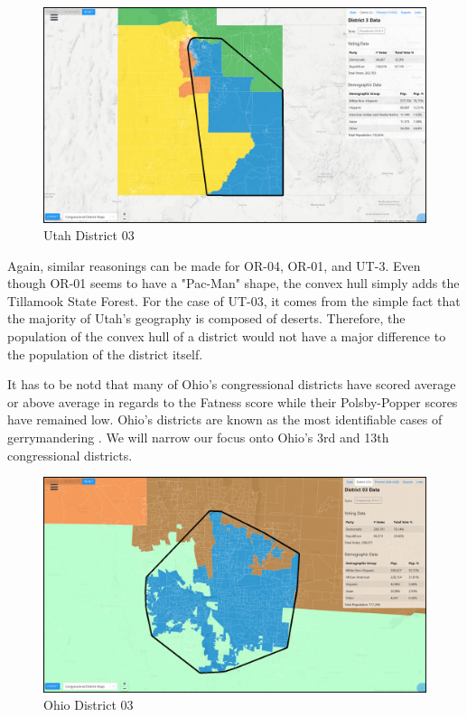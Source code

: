 \documentclass[letterpaper]{article}
\begin{document}
\begin{figure}[H]
	\includegraphics[width=\linewidth]{./figures/UT-03-ConvexHull.png}
	\caption{Utah District 03}
	\label{fig:ut03ch}
\end{figure}

Again, similar reasonings can be made for OR-04, OR-01, and UT-3. Even though OR-01 seems to have a "Pac-Man" shape, the convex hull simply adds the Tillamook State Forest. For the case of UT-03, it comes from the simple fact that the majority of Utah's geography is composed of deserts. Therefore, the population of the convex hull of a district would not have a major difference to the population of the district itself.

It has to be notd that many of Ohio's congressional districts have scored average or above average in regards to the Fatness score while their Polsby-Popper scores have remained low. Ohio's districts are known as the most identifiable cases of gerrymandering \cite{ohiog}. We will narrow our focus onto Ohio's 3rd and 13th congressional districts.

\begin{figure}[H]
	\includegraphics[width=\linewidth]{./figures/OH-03-ConvexHull.png}
	\caption{Ohio District 03}
	\label{fig:oh03ch}
\end{figure}
\end{document}
